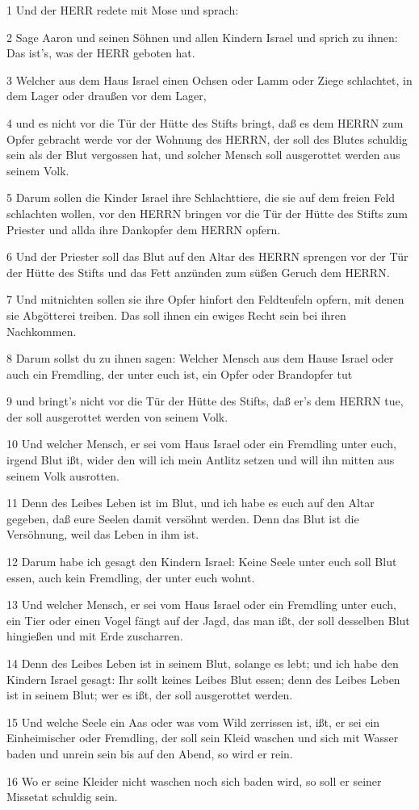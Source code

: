 \par 1 Und der HERR redete mit Mose und sprach:
\par 2 Sage Aaron und seinen Söhnen und allen Kindern Israel und sprich zu ihnen: Das ist's, was der HERR geboten hat.
\par 3 Welcher aus dem Haus Israel einen Ochsen oder Lamm oder Ziege schlachtet, in dem Lager oder draußen vor dem Lager,
\par 4 und es nicht vor die Tür der Hütte des Stifts bringt, daß es dem HERRN zum Opfer gebracht werde vor der Wohnung des HERRN, der soll des Blutes schuldig sein als der Blut vergossen hat, und solcher Mensch soll ausgerottet werden aus seinem Volk.
\par 5 Darum sollen die Kinder Israel ihre Schlachttiere, die sie auf dem freien Feld schlachten wollen, vor den HERRN bringen vor die Tür der Hütte des Stifts zum Priester und allda ihre Dankopfer dem HERRN opfern.
\par 6 Und der Priester soll das Blut auf den Altar des HERRN sprengen vor der Tür der Hütte des Stifts und das Fett anzünden zum süßen Geruch dem HERRN.
\par 7 Und mitnichten sollen sie ihre Opfer hinfort den Feldteufeln opfern, mit denen sie Abgötterei treiben. Das soll ihnen ein ewiges Recht sein bei ihren Nachkommen.
\par 8 Darum sollst du zu ihnen sagen: Welcher Mensch aus dem Hause Israel oder auch ein Fremdling, der unter euch ist, ein Opfer oder Brandopfer tut
\par 9 und bringt's nicht vor die Tür der Hütte des Stifts, daß er's dem HERRN tue, der soll ausgerottet werden von seinem Volk.
\par 10 Und welcher Mensch, er sei vom Haus Israel oder ein Fremdling unter euch, irgend Blut ißt, wider den will ich mein Antlitz setzen und will ihn mitten aus seinem Volk ausrotten.
\par 11 Denn des Leibes Leben ist im Blut, und ich habe es euch auf den Altar gegeben, daß eure Seelen damit versöhnt werden. Denn das Blut ist die Versöhnung, weil das Leben in ihm ist.
\par 12 Darum habe ich gesagt den Kindern Israel: Keine Seele unter euch soll Blut essen, auch kein Fremdling, der unter euch wohnt.
\par 13 Und welcher Mensch, er sei vom Haus Israel oder ein Fremdling unter euch, ein Tier oder einen Vogel fängt auf der Jagd, das man ißt, der soll desselben Blut hingießen und mit Erde zuscharren.
\par 14 Denn des Leibes Leben ist in seinem Blut, solange es lebt; und ich habe den Kindern Israel gesagt: Ihr sollt keines Leibes Blut essen; denn des Leibes Leben ist in seinem Blut; wer es ißt, der soll ausgerottet werden.
\par 15 Und welche Seele ein Aas oder was vom Wild zerrissen ist, ißt, er sei ein Einheimischer oder Fremdling, der soll sein Kleid waschen und sich mit Wasser baden und unrein sein bis auf den Abend, so wird er rein.
\par 16 Wo er seine Kleider nicht waschen noch sich baden wird, so soll er seiner Missetat schuldig sein.

